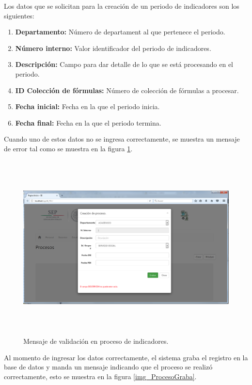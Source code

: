 			Los datos que se solicitan para la creaci\'on de un periodo de indicadores son los siguientes:
			\begin{enumerate}[1.]
				\item \textbf{Departamento:} N\'umero de departament al que pertenece el periodo.
				\item \textbf{N\'umero interno:} Valor identificador del periodo de indicadores.
				\item \textbf{Descripci\'on:} Campo para dar detalle de lo que se est\'a procesando en el periodo.
				\item \textbf{ID Colecci\'on de f\'ormulas:} N\'umero de colecci\'on de f\'ormulas a procesar.
				\item \textbf{Fecha inicial:} Fecha en la que el periodo inicia.
				\item \textbf{Fecha final:} Fecha en la que el periodo termina.
			\end{enumerate}

			Cuando uno de estos datos no se ingresa correctamente, se muestra un mensaje de error tal como se muestra en la figura \ref{fig_ProcesoValida}.\\

			\begin{figure}[]
		        \centering
		        \includegraphics[width=16cm, height=9.5cm]{figuras/ProcesoValida}
		        \caption{Mensaje de validaci\'on en proceso de indicadores.}
		        \label{fig_ProcesoValida}
		    \end{figure}

		    Al momento de ingresar los datos correctamente, el sistema graba el registro en la base de datos y manda un mensaje indicando que el proceso se realiz\'o correctamente, esto se muestra en la figura \ref{img_ProcesoGraba}.\\


